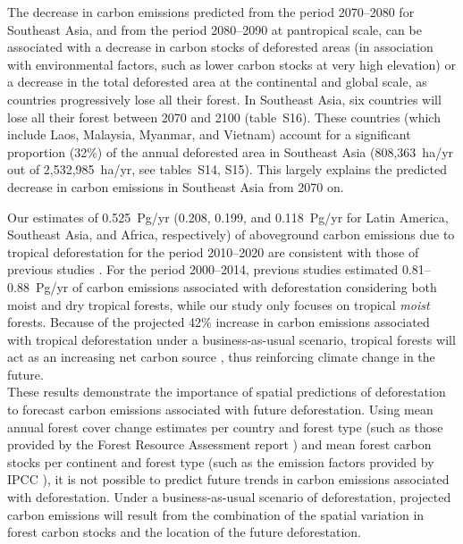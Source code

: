 \documentclass[
  12pt,
]{article}
\begin{document}
The decrease in carbon emissions predicted from the period 2070--2080 for Southeast Asia, and from the period 2080--2090 at pantropical scale, can be associated with a decrease in carbon stocks of deforested areas (in association with environmental factors, such as lower carbon stocks at very high elevation) or a decrease in the total deforested area at the continental and global scale, as countries progressively lose all their forest. In Southeast Asia, six countries will lose all their forest between 2070 and 2100 (table~S16). These countries (which include Laos, Malaysia, Myanmar, and Vietnam) account for a significant proportion (32\%) of the annual deforested area in Southeast Asia (808,363~ha/yr out of 2,532,985~ha/yr, see tables~S14, S15). This largely explains the predicted decrease in carbon emissions in Southeast Asia from 2070 on.\\

\newpage

Our estimates of 0.525~Pg/yr (0.208, 0.199, and 0.118~Pg/yr for Latin America, Southeast Asia, and Africa, respectively) of aboveground carbon emissions due to tropical deforestation for the period 2010--2020 are consistent with those of previous studies \citep{Baccini2017, Achard2014, Harris2012}. For the period 2000--2014, previous studies estimated 0.81--0.88~Pg/yr of carbon emissions associated with deforestation considering both moist and dry tropical forests, while our study only focuses on tropical \emph{moist} forests. Because of the projected 42\% increase in carbon emissions associated with tropical deforestation under a business-as-usual scenario, tropical forests will act as an increasing net carbon source \citep{Baccini2017}, thus reinforcing climate change in the future.\\

These results demonstrate the importance of spatial predictions of deforestation to forecast carbon emissions associated with future deforestation. Using mean annual forest cover change estimates per country and forest type (such as those provided by the Forest Resource Assessment report \citep{FAO2015}) and mean forest carbon stocks per continent and forest type (such as the emission factors provided by IPCC \citep{IPCC2019}), it is not possible to predict future trends in carbon emissions associated with deforestation. Under a business-as-usual scenario of deforestation, projected carbon emissions will result from the combination of the spatial variation in forest carbon stocks and the location of the future deforestation.
\end{document}
